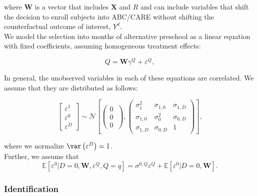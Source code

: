 \noindent where $\mathbf{W}$ is a vector that includes $\mathbf{X}$ and $R$ and can include variables that shift the decision to enroll subjects into ABC/CARE without shifting the counterfactual outcome of interest, $Y^{d}$. \\

\noindent We model the selection into months of alternative preschool as a linear equation with fixed coefficients, assuming homogeneous treatment effects:

\begin{equation}
Q = \mathbf{W} \gamma^{Q} + \varepsilon^{Q}, \label{eq:selq}
\end{equation}

\noindent In general, the unobserved variables in each of these equations are correlated. We assume that they are distributed as follows:

\begin{equation}
        \left[ \begin{array}{l}
        	 \varepsilon^1 \\
            \varepsilon^0 \\
            \varepsilon^D
        \end{array} \right]  \sim \mathcal{N} \left[ \left( \begin{array}{l}
        	 0 \\
           0 \\
           0
        \end{array} \ \right),
                \left( \begin{array}{llll}
        	 \sigma_{1}^2 & \sigma_{1,0} & \sigma_{1,D}   \\
             \sigma_{1,0} & \sigma_{0}^2 & \sigma_{0,D}   \\
             \sigma_{1,D} & \sigma_{0,D} & 1
        \end{array} \right) \right],  \label{eq:udist}
\end{equation}

\noindent where we normalize $\var \left( \varepsilon^D \right) =1$.\\

\noindent Further, we assume that
\begin{equation}
\mathbb{E}\left[\varepsilon^0|D=0,\mathbf{W},\varepsilon^{Q},Q=q\right]=\sigma^{0,Q}\varepsilon^{Q}+\mathbb{E}\left[\varepsilon^0|D=0,\mathbf{W}\right].
\label{eq:E[epsilon0]}
\end{equation}

\subsubsection{Identification}


